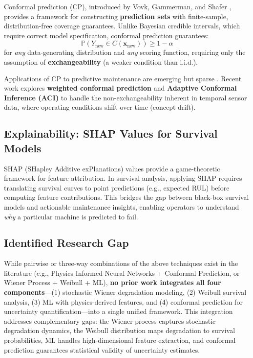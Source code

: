 \documentclass[12pt, a4paper]{article}
\newcommand{\Prob}{\mathbb{P}}
\begin{document}
Conformal prediction (CP), introduced by Vovk, Gammerman, and Shafer \citep{vovk2005}, provides a framework for constructing \textbf{prediction sets} with finite-sample, distribution-free coverage guarantees. Unlike Bayesian credible intervals, which require correct model specification, conformal prediction guarantees:
\begin{equation}\label{eq:cp-guarantee}
    \Prob\!\left(Y_{\mathrm{new}} \in C(\mathbf{x}_{\mathrm{new}})\right) \geq 1 - \alpha
\end{equation}
for \textit{any} data-generating distribution and \textit{any} scoring function, requiring only the assumption of \textbf{exchangeability} (a weaker condition than i.i.d.).

Applications of CP to predictive maintenance are emerging but sparse \citep{angelopoulos2023}. Recent work explores \textbf{weighted conformal prediction} and \textbf{Adaptive Conformal Inference (ACI)} \citep{gibbs2021} to handle the non-exchangeability inherent in temporal sensor data, where operating conditions shift over time (concept drift).

\subsection{Explainability: SHAP Values for Survival Models}

SHAP (SHapley Additive exPlanations) values \citep{lundberg2017} provide a game-theoretic framework for feature attribution. In survival analysis, applying SHAP requires translating survival curves to point predictions (e.g., expected RUL) before computing feature contributions. This bridges the gap between black-box survival models and actionable maintenance insights, enabling operators to understand \textit{why} a particular machine is predicted to fail.

\subsection{Identified Research Gap}

While pairwise or three-way combinations of the above techniques exist in the literature (e.g., Physics-Informed Neural Networks + Conformal Prediction, or Wiener Process + Weibull + ML), \textbf{no prior work integrates all four components}---(1) stochastic Wiener degradation modeling, (2) Weibull survival analysis, (3) ML with physics-derived features, and (4) conformal prediction for uncertainty quantification---into a single unified framework. This integration addresses complementary gaps: the Wiener process captures stochastic degradation dynamics, the Weibull distribution maps degradation to survival probabilities, ML handles high-dimensional feature extraction, and conformal prediction guarantees statistical validity of uncertainty estimates.
\end{document}
